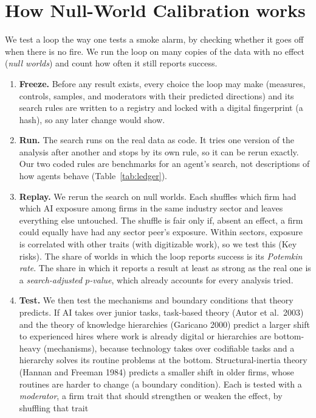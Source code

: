 \documentclass[11pt]{article}
\begin{document}
\section*{How Null-World Calibration works}
We test a loop the way one tests a smoke alarm, by checking whether it goes off when there is no fire. We run the loop on many copies of the data with no effect (\emph{null worlds}) and count how often it still reports
success.
\begin{enumerate}
\item \textbf{Freeze.} Before any result exists, every choice the loop may make (measures, controls, samples, and
moderators with their predicted directions) and its search rules are written to a registry and locked with a digital
fingerprint (a hash), so any later change would show.
\item \textbf{Run.} The search runs on the real data as code. It tries one version of the analysis after another and stops
by its own rule, so it can be rerun exactly. Our two coded rules are benchmarks for an agent's search, not
descriptions of how agents behave (Table~\ref{tab:ledger}).
\item \textbf{Replay.} We rerun the search on \Bnull null worlds. Each shuffles which firm had which AI exposure among firms
in the same industry sector and leaves everything else untouched. The shuffle is fair only if, absent an effect, a firm
could equally have had any sector peer's exposure. Within sectors, exposure is correlated with other traits
(\VcorrExpRem with digitizable work), so we test this (Key risks). The share of worlds in which the loop reports success
is its \emph{Potemkin rate}. The share in which it reports a result at least as strong as the real one is a
\emph{search-adjusted $p$-value}, which already accounts for every analysis tried.
\item \textbf{Test.} We then test the mechanisms and boundary conditions that theory predicts. If AI takes over junior
tasks, task-based theory (Autor et al.\ 2003) and the theory of knowledge hierarchies (Garicano 2000) predict a larger
shift to experienced hires where work is already digital or hierarchies are bottom-heavy (mechanisms), because
technology takes over codifiable tasks and a hierarchy solves its routine problems at the bottom. Structural-inertia
theory (Hannan and Freeman 1984) predicts a smaller shift in older firms, whose routines are harder to change (a
boundary condition). Each
is tested with a \emph{moderator}, a firm trait that should strengthen or weaken the effect, by shuffling that trait

\end{enumerate}
\end{document}
